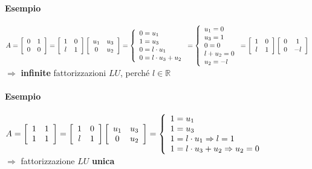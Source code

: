 \documentclass[10pt]{book}
\begin{document}
\paragraph{Esempio} \begin{math}
A = \left[
\begin{array}{c c}
	0 & 1\\
	0 & 0
\end{array}
\right]
= \left[
\begin{array}{c c}
	1 & 0\\
	l & 1
\end{array}
\right]
\left[
\begin{array}{c c}
	u_1 & u_3\\
	0 & u_2
\end{array}
\right]
= \left\{
\begin{array}{l}
	0 = u_1\\
	1 = u_3\\
	0 = l\cdot u_1\\
	0 = l\cdot u_3 + u_2
\end{array}
\right.
= \left\{
\begin{array}{l}
	u_1 = 0\\
	u_3 = 1\\
	0 = 0\\
	l + u_2 = 0\\
	u_2 = -l
\end{array}
\right.
= \left[
\begin{array}{c c}
	1 & 0\\
	l & 1
\end{array}
\right]
\left[
\begin{array}{c c}
	0 & 1\\
	0 & -l
\end{array}
\right]
\end{math}\\
$\Rightarrow$ \textbf{infinite} fattorizzazioni $LU$, perché $l \in \mathbb{R}$
\paragraph{Esempio} \begin{math}
A = \left[
\begin{array}{c c}
	1 & 1\\
	1 & 1
\end{array}
\right]
= \left[
\begin{array}{c c}
	1 & 0\\
	l & 1
\end{array}
\right]
\left[
\begin{array}{c c}
	u_1 & u_3\\
	0 & u_2
\end{array}
\right]
= \left\{
\begin{array}{l}
	1 = u_1\\
	1 = u_3\\
	1 = l\cdot u_1 \Rightarrow l = 1\\
	1 = l\cdot u_3 + u_2 \Rightarrow u_2 = 0
\end{array}
\right.
\end{math}\\
$\Rightarrow$ fattorizzazione $LU$ \textbf{unica}
\end{document}
